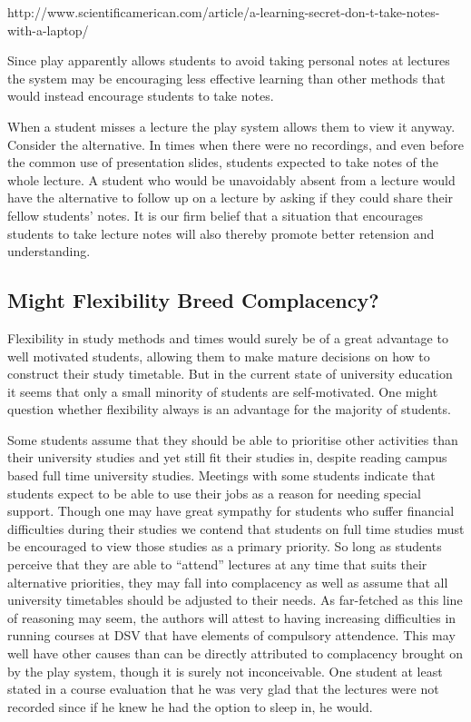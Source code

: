 \documentclass[a4paper,10pt]{article}
\begin{document}
http://www.scientificamerican.com/article/a-learning-secret-don-t-take-notes-with-a-laptop/

Since play apparently allows students to avoid taking personal notes at lectures the system may be encouraging less effective learning than other methods that would instead encourage students to take notes.


When a student misses a lecture the play system allows them to view it anyway. Consider the alternative. In times when there were no recordings, and even before the common use of presentation slides, students expected to take notes of the whole lecture. A student who would be unavoidably absent from a lecture would have the alternative to follow up on a lecture by asking if they could share their fellow students' notes. It is our firm belief that a situation that encourages students to take lecture notes will also thereby promote better retension and understanding.

\subsection{Might Flexibility Breed Complacency?}
Flexibility in study methods and times would surely be of a great advantage to well motivated students, allowing them to make mature decisions on how to construct their study timetable. But in the current state of university education it seems that only a small minority of students are self-motivated. One might question whether flexibility always is an advantage for the majority of students.

Some students assume that they should be able to prioritise other activities than their university studies and yet still fit their studies in, despite reading campus based full time university studies. Meetings with some students indicate that students expect to be able to use their jobs as a reason for needing special support. Though one may have great sympathy for students who suffer financial difficulties during their studies we contend that students on full time studies must be encouraged to view those studies as a primary priority. So long as students perceive that they are able to ``attend'' lectures at any time that suits their alternative priorities, they may fall into complacency as well as assume that all university timetables should be adjusted to their needs. As far-fetched as this line of reasoning may seem, the authors will attest to having increasing difficulties in running courses at DSV that have elements of compulsory attendence. This may well have other causes than can be directly attributed to complacency brought on by the play system, though it is surely not inconceivable. One student at least stated in a course evaluation that he was very glad that the lectures were not recorded since if he knew he had the option to sleep in, he would.
\end{document}
